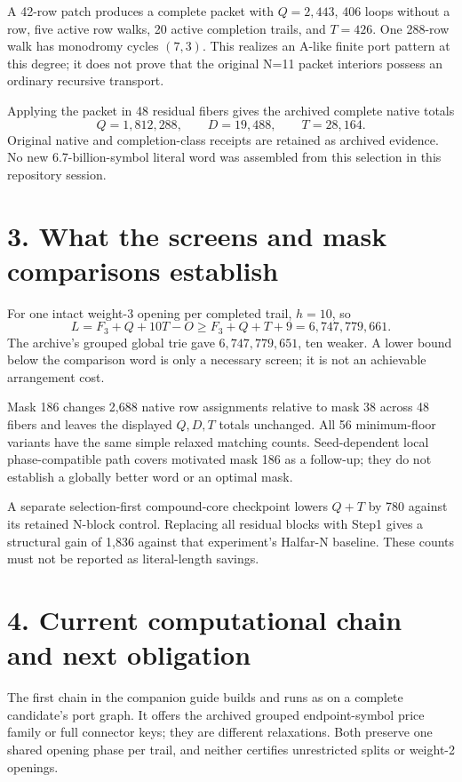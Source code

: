 \documentclass[11pt]{article}
\begin{document}
A 42-row patch produces a complete packet with $Q=2,443$, 406 loops without
a row, five active row walks, 20 active completion trails, and $T=426$.
One 288-row walk has monodromy cycles $(7,3)$. This realizes an A-like
finite port pattern at this degree; it does not prove that the original
N=11 packet interiors possess an ordinary recursive transport.

Applying the packet in 48 residual fibers gives the archived complete
native totals
\[
Q=1{,}812{,}288,\qquad D=19{,}488,\qquad T=28{,}164.
\]
Original native and completion-class receipts are retained as archived
evidence. No new 6.7-billion-symbol literal word was assembled from this
selection in this repository session.

\section*{3. What the screens and mask comparisons establish}
For one intact weight-3 opening per completed trail, $h=10$, so
\[
L=F_3+Q+10T-O\geq F_3+Q+T+9=6{,}747{,}779{,}661.
\]
The archive's grouped global trie gave $6{,}747{,}779{,}651$, ten weaker.
A lower bound below the comparison word is only a necessary screen;
it is not an achievable arrangement cost.

Mask 186 changes 2,688 native row assignments relative to mask 38 across
48 fibers and leaves the displayed $Q,D,T$ totals unchanged. All 56
minimum-floor variants have the same simple relaxed matching counts.
Seed-dependent local phase-compatible path covers motivated mask 186 as
a follow-up; they do not establish a globally better word or an optimal mask.

A separate selection-first compound-core checkpoint lowers $Q+T$ by 780
against its retained N-block control. Replacing all residual blocks with
Step1 gives a structural gain of 1,836 against that experiment's Halfar-N
baseline. These counts must not be reported as literal-length savings.

\section*{4. Current computational chain and next obligation}
The first chain in the companion guide builds and runs
 as  on a complete candidate's
port graph. It offers the archived grouped endpoint-symbol price family
or full connector keys; they are different relaxations. Both preserve one
shared opening phase per trail, and neither certifies unrestricted splits
or weight-2 openings.
\end{document}
